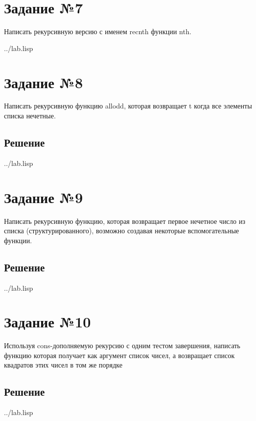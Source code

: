 \section*{Задание №7}
Написать рекурсивную версию с именем recnth функции nth.
\begin{lstinputlisting}[label=third,caption=Решение задания №7, language=lisp, firstline=58, lastline=61]{../lab.lisp}
\end{lstinputlisting}

\section*{Задание №8}
Написать рекурсивную функцию allodd, которая возвращает t когда все элементы списка
нечетные.
\subsection*{Решение}
\begin{lstinputlisting}[label=third,caption=Решение задания №8, language=lisp, firstline=64, lastline=69]{../lab.lisp}
\end{lstinputlisting}	

\section*{Задание №9}
Написать рекурсивную функцию, которая возвращает первое нечетное число из списка
(структурированного), возможно создавая некоторые вспомогательные функции.
\subsection*{Решение}
\begin{lstinputlisting}[label=third,caption=Решение задания №8, language=lisp, firstline=72, lastline=76]{../lab.lisp}
\end{lstinputlisting}

\section*{Задание №10}
Используя cons-дополняемую рекурсию с одним тестом завершения,
написать функцию которая получает как аргумент список чисел, а возвращает список
квадратов этих чисел в том же порядке
\subsection*{Решение}
\begin{lstinputlisting}[label=third,caption=Решение задания №8, language=lisp, firstline=79, lastline=81]{../lab.lisp}
\end{lstinputlisting}


